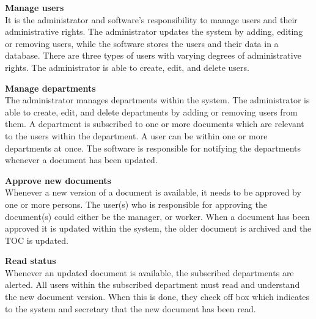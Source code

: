 \textbf{Manage users}
\\
It is the administrator and software's responsibility to manage users and their administrative rights.
The administrator updates the system by adding, editing or removing users, while the software stores the users and their data in a database.
There are three types of users with varying degrees of administrative rights.
The administrator is able to create, edit, and delete users.

\textbf{Manage departments}
\\
The administrator manages departments within the system.
The administrator is able to create, edit, and delete departments by adding or removing users from them.
A department is subscribed to one or more documents which are relevant to the users within the department.
A user can be within one or more departments at once.
The software is responsible for notifying the departments whenever a document has been updated.

\textbf{Approve new documents}
\\
Whenever a new version of a document is available, it needs to be approved by one or more persons.
The user(s) who is responsible for approving the document(s) could either be the manager, or worker.
When a document has been approved it is updated within the system, the older document is archived and the TOC is updated.

\textbf{Read status}
\\
Whenever an updated document is available, the subscribed departments are alerted.
All users within the subscribed department must read and understand the new document version.
When this is done, they check off box which indicates to the system and secretary that the new document has been read.
